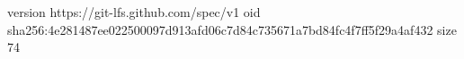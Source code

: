 version https://git-lfs.github.com/spec/v1
oid sha256:4e281487ee022500097d913afd06c7d84c735671a7bd84fc4f7ff5f29a4af432
size 74
